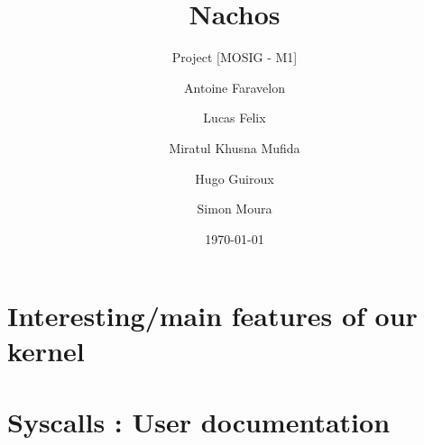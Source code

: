 \documentclass[a4paper,10pt]{article}
\title{Nachos}
\subtitle{Project [MOSIG - M1]}
\author{Antoine Faravelon \and Lucas Felix \and Miratul Khusna Mufida \and Hugo Guiroux \and Simon Moura}
\date{\today}
\begin{document}
\maketitle

\newpage
\tableofcontents
\newpage

\begin{abstract}
\end{abstract}

\section{Interesting/main features of our kernel}
\section{Syscalls : User documentation}
\end{document}
